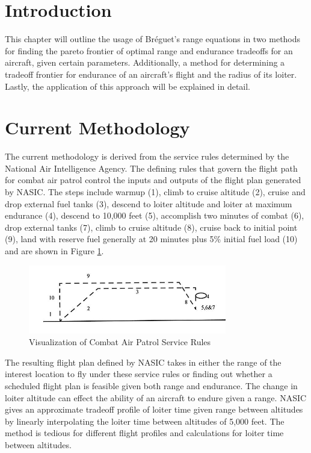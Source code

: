 \section{Introduction}
This chapter will outline the usage of Br\'eguet's range equations in two methods for finding the pareto frontier of optimal range and endurance tradeoffs for an aircraft, given certain parameters. Additionally, a method for determining a tradeoff frontier for endurance of an aircraft's flight and the radius of its loiter. Lastly, the application of this approach will be explained in detail.\par
\section{Current Methodology}
The current methodology is derived from the service rules determined by the National Air Intelligence Agency. The defining rules that govern the flight path for combat air patrol control the inputs and outputs of the flight plan generated by NASIC. The steps include warmup (1), climb to cruise altitude (2), cruise and drop external fuel tanks (3), descend to loiter altitude and loiter at maximum endurance (4), descend to 10,000 feet (5), accomplish two minutes of combat (6), drop external tanks (7), climb to cruise altitude (8), cruise back to initial point (9), land with reserve fuel generally at 20 minutes plus 5\% initial fuel load (10) and are shown in Figure \ref{fig: serviceRules}.\par
\begin{figure}[H]
    \centering
    \includegraphics{Thesis/Method/CombatServiceRules.PNG}
    \caption{Visualization of Combat Air Patrol Service Rules}
    \label{fig: serviceRules}
\end{figure}
The resulting flight plan defined by NASIC takes in either the range of the interest location to fly under these service rules or finding out whether a scheduled flight plan is feasible given both range and endurance. The change in loiter altitude can effect the ability of an aircraft to endure given a range. NASIC gives an approximate tradeoff profile of loiter time given range between altitudes by linearly interpolating the loiter time between altitudes of 5,000 feet. The method is tedious for different flight profiles and calculations for loiter time between altitudes.
